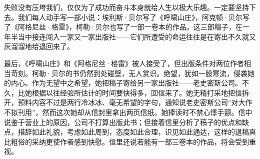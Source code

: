 {失败没有压垮我们，仅仅为了成功而奋斗本身就给人生以极大乐趣。一定要坚持下去。我们每人动手写一部小说：埃利斯·贝尔写了《呼啸山庄》，阿克顿·贝尔写了《阿格尼丝·格雷》，柯勒·贝尔也写了一部一卷本的作品。这三部稿子，在一年半当中接连闯入一家又一家出版社——它们所遭受的命运往往是在寄出不久就又灰溜溜地给退回来了。

最后，《呼啸山庄》和《阿格尼丝·格雷》被人接受了，但出版条件对两位作者相当苛刻。柯勒·贝尔的书仍然到处碰壁，无人赏识。绝望，犹如一股寒流，侵袭她的内心。作为无望中之希望，她把稿子寄给另一家出版社——老史密斯公司。不久，比她根据以往经验所估计的时间要快得多，回信来了。她无精打采地把信拆开，预料内容不过是两行冷冰冰、毫无希望的字句，通知说老史密斯公司“对大作不拟刊用”，然而这次她却从信封里拿出两页信纸。她捧读时不禁心悸手颤。信中说鉴于营业上的原因，公司不打算出版此书；但接着信里分析了稿子的优点和缺点，措辞如此礼貌，考虑如此周到，态度如此合理，识见如此通达，这样的退稿真比粗俗的采纳更使作者感到快慰。信里还说若能有一部三卷本的作品，将会受到重视。
}